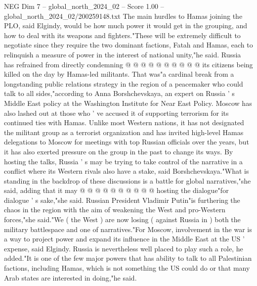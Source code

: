 \begin{textsample}{NEG Dim 7 – global\_north\_2024\_02 – Score 1.00 – global\_north\_2024\_02/200259148.txt}
The main hurdles to Hamas joining the PLO, said Elgindy, would be how much power it would get in the grouping, and how to deal with its weapons and fighters."These will be extremely difficult to negotiate since they require the two dominant factions, Fatah and Hamas, each to relinquish a measure of power in the interest of national unity,"he said.
Russia has refrained from directly condemning @ @ @ @ @ @ @ @ @ @ its citizens being killed on the day by Hamas-led militants.
That was"a cardinal break from a longstanding public relations strategy in the region of a peacemaker who could talk to all sides,"according to Anna Borshchevskaya, an expert on Russia ' s Middle East policy at the Washington Institute for Near East Policy.
Moscow has also lashed out at those who ' ve accused it of supporting terrorism for its continued ties with Hamas.
Unlike most Western nations, it has not designated the militant group as a terrorist organization and has invited high-level Hamas delegations to Moscow for meetings with top Russian officials over the years, but it has also exerted pressure on the group in the past to change its ways.
By hosting the talks, Russia ' s may be trying to take control of the narrative in a conflict where its Western rivals also have a stake, said Borshchevskaya."What is standing in the backdrop of these discussions is a battle for global narratives,"she said, adding that it may @ @ @ @ @ @ @ @ @ @ hosting the dialogue"for dialogue ' s sake,"she said.
Russian President Vladimir Putin"is furthering the chaos in the region with the aim of weakening the West and pro-Western forces,"she said."We ( the West ) are now losing ( against Russia in ) both the military battlespace and one of narratives."For Moscow, involvement in the war is a way to project power and expand its influence in the Middle East at the US ' expense, said Elgindy.
Russia is nevertheless well placed to play such a role, he added."It is one of the few major powers that has ability to talk to all Palestinian factions, including Hamas, which is not something the US could do or that many Arab states are interested in doing,"he said.

\end{textsample}
